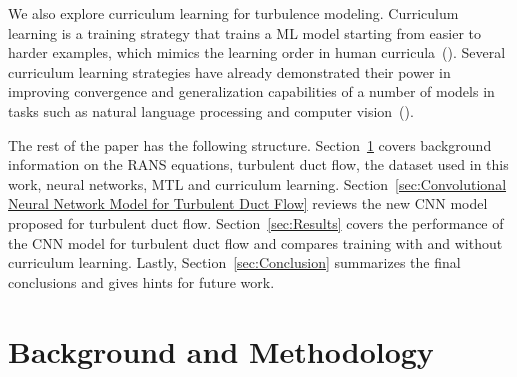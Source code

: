 \documentclass[11pt]{article}
\numberwithin{equation}{section}
\theoremstyle{plain}
\theoremstyle{definition}
\begin{document}

We also explore curriculum learning for turbulence modeling. Curriculum learning is a training strategy that trains a ML model starting from easier to harder examples, which mimics the learning order in human curricula~(\cite{ELMAN199371,rohde}). Several curriculum learning strategies have already demonstrated their power in improving convergence and generalization capabilities of a number of models in tasks such as natural language processing and computer vision~(\cite{cl_survey}).

The rest of the paper has the following structure. Section~\ref{sec:Background} covers background information on the RANS equations, turbulent duct flow, the dataset used in this work, neural networks, MTL and curriculum learning. Section~\ref{sec:Convolutional Neural Network Model for Turbulent Duct Flow} reviews the new CNN model proposed for turbulent duct flow. Section~\ref{sec:Results} covers the performance of the CNN model for turbulent duct flow and compares training with and without curriculum learning. Lastly, Section~\ref{sec:Conclusion} summarizes the final conclusions and gives hints for future work.

\section{Background and Methodology}
\label{sec:Background}
\end{document}
